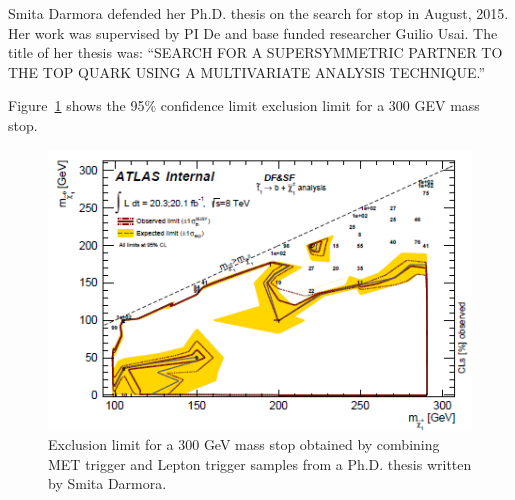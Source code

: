 Smita Darmora defended her Ph.D. thesis on the search for stop in August, 2015. Her work was supervised by PI De and base funded researcher Guilio Usai. The title of her thesis was: ``SEARCH FOR A SUPERSYMMETRIC PARTNER TO THE TOP QUARK
USING A MULTIVARIATE ANALYSIS TECHNIQUE.'' 

Figure~\ref{smita_limit} shows the 95\% confidence limit exclusion limit for a 300 GEV mass stop.

\begin{figure}[hbt]
  \includegraphics[width=\linewidth]{smita_limit.png}
  \caption{Exclusion limit for a 300 GeV mass stop obtained by combining MET trigger and Lepton trigger samples from a Ph.D.  thesis written by Smita Darmora.}
  \label{smita_limit}
\end{figure}
